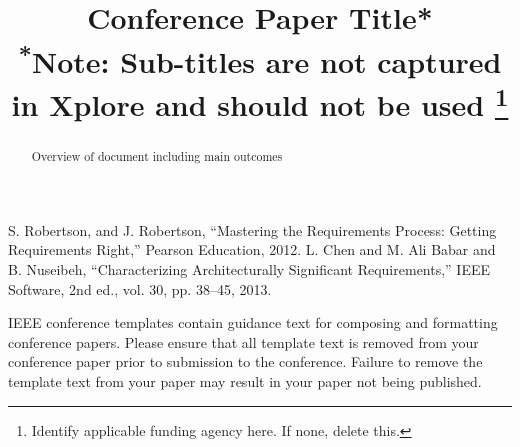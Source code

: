 \documentclass[conference]{IEEEtran}
\begin{document}
\title{Conference Paper Title*\\
{\footnotesize \textsuperscript{*}Note: Sub-titles are not captured in Xplore and
should not be used}
\thanks{Identify applicable funding agency here. If none, delete this.}
}

\author{
\and
{}
\and
{}
\and
{}
}

\maketitle

\begin{abstract}
Overview of document including main outcomes
\end{abstract}















\begin{thebibliography}{00}
 S. Robertson, and J. Robertson, ``Mastering the Requirements Process: Getting Requirements Right,'' Pearson Education, 2012.
 L. Chen and M. Ali Babar and B. Nuseibeh, ``Characterizing Architecturally Significant Requirements,'' IEEE Software, 2nd ed., vol. 30, pp. 38--45, 2013.
\end{thebibliography}
\vspace{12pt}
\color{red}
IEEE conference templates contain guidance text for composing and formatting conference papers. Please ensure that all template text is removed from your conference paper prior to submission to the conference. Failure to remove the template text from your paper may result in your paper not being published.
\end{document}
